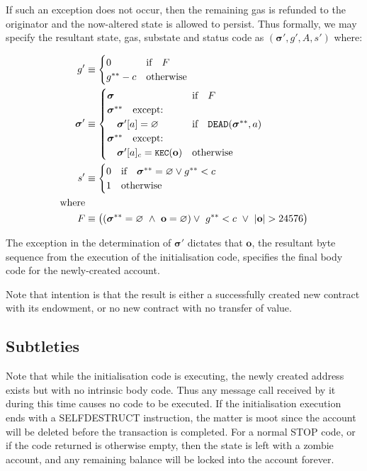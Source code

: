\documentclass[9pt,oneside]{amsart}
\begin{document}
\begin{multicols}{2}
If such an exception does not occur, then the remaining gas is refunded to the originator and the now-altered state is allowed to persist. Thus formally, we may specify the resultant state, gas, substate and status code as $(\boldsymbol{\sigma}', g', A, s')$ where:

\begin{align}
\quad g' &\equiv \begin{cases}
0 & \text{if} \quad F \\
g^{**} - c & \text{otherwise} \\
\end{cases} \\
\quad \boldsymbol{\sigma}' &\equiv  \begin{cases}
\boldsymbol{\sigma} & \text{if} \quad F \\
\boldsymbol{\sigma}^{**} \quad \text{except:} & \\
\quad\boldsymbol{\sigma}'[a] = \varnothing & \text{if} \quad \mathtt{\tiny DEAD}(\boldsymbol{\sigma}^{**}, a) \\
\boldsymbol{\sigma}^{**} \quad \text{except:} & \\
\quad\boldsymbol{\sigma}'[a]_c = \texttt{\small KEC}(\mathbf{o}) & \text{otherwise}
\end{cases} \\
\quad s' &\equiv \begin{cases}
0 & \text{if} \quad \boldsymbol{\sigma}^{**} = \varnothing \lor g^{**} < c \\
1 & \text{otherwise}
\end{cases} \\
\nonumber \text{where} \\
F &\equiv \big((\boldsymbol{\sigma}^{**} = \varnothing \ \wedge\ \mathbf{o} = \varnothing) \vee\  g^{**} < c \ \vee\  |\mathbf{o}| > 24576\big)
\end{align}

The exception in the determination of $\boldsymbol{\sigma}'$ dictates that $\mathbf{o}$, the resultant byte sequence from the execution of the initialisation code, specifies the final body code for the newly-created account.

Note that intention is that the result is either a successfully created new contract with its endowment, or no new contract with no transfer of value.

\subsection{Subtleties}
Note that while the initialisation code is executing, the newly created address exists but with no intrinsic body code. Thus any message call received by it during this time causes no code to be executed. If the initialisation execution ends with a {\small SELFDESTRUCT} instruction, the matter is moot since the account will be deleted before the transaction is completed. For a normal {\small STOP} code, or if the code returned is otherwise empty, then the state is left with a zombie account, and any remaining balance will be locked into the account forever.


\end{multicols}
\end{document}
